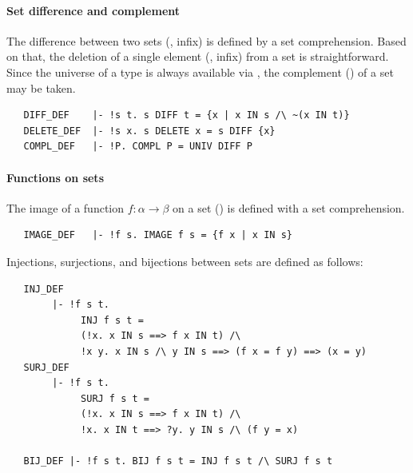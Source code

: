 \paragraph{Set difference and complement}

The difference between two sets (, infix) is defined by a
set comprehension. Based on that, the deletion of a single element
(, infix) from a set is straightforward. Since the
universe of a type is always available via , the
complement () of a set may be taken.
\begin{hol}
\begin{verbatim}
   DIFF_DEF    |- !s t. s DIFF t = {x | x IN s /\ ~(x IN t)}
   DELETE_DEF  |- !s x. s DELETE x = s DIFF {x}
   COMPL_DEF   |- !P. COMPL P = UNIV DIFF P
\end{verbatim}
\end{hol}

\paragraph{Functions on sets}
The image of a function $f :\alpha \to \beta$ on
a set () is defined with a set comprehension.
\begin{hol}
\begin{verbatim}
   IMAGE_DEF   |- !f s. IMAGE f s = {f x | x IN s}
\end{verbatim}
\end{hol}
%
Injections, surjections, and bijections between sets are defined
as follows:
%
\begin{hol}
\begin{verbatim}
   INJ_DEF
        |- !f s t.
             INJ f s t =
             (!x. x IN s ==> f x IN t) /\
             !x y. x IN s /\ y IN s ==> (f x = f y) ==> (x = y)
   SURJ_DEF
        |- !f s t.
             SURJ f s t =
             (!x. x IN s ==> f x IN t) /\
             !x. x IN t ==> ?y. y IN s /\ (f y = x)

   BIJ_DEF |- !f s t. BIJ f s t = INJ f s t /\ SURJ f s t
\end{verbatim}
\end{hol}

